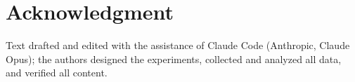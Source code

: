 \documentclass[10pt,conference]{IEEEtran}
\begin{document}
\section*{Acknowledgment}
Text drafted and edited with the assistance of Claude Code (Anthropic,
Claude Opus); the authors designed the experiments, collected and analyzed
all data, and verified all content.



\end{document}
